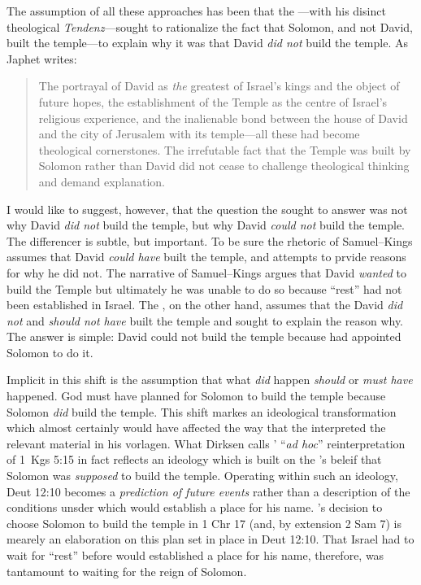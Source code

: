 The assumption of all these approaches has been that the \chronicler---with his disinct theological \emph{Tendenz}---sought to rationalize the fact that Solomon, and not David, built the temple---to explain why it was that David \emph{did not} build the temple. As Japhet writes:
\begin{quote}
    The portrayal of David as \emph{the} greatest of Israel's kings and the object of future hopes, the establishment of the Temple as the centre of Israel's religious experience, and the inalienable bond between the house of David and the city of Jerusalem with its temple---all these had become theological cornerstones. The irrefutable fact that the Temple was built by Solomon rather than David did not cease to challenge theological thinking and demand explanation.\autocite[396]{japhet1993}
\end{quote}
\noindent
I would like to suggest, however, that the question the \chronicler sought to answer was not why David \emph{did not} build the temple, but why David \emph{could not} build the temple. The differencer is subtle, but important. To be sure the rhetoric of Samuel--Kings assumes that David \emph{could have} built the temple, and attempts to prvide reasons for why he did not. The narrative of Samuel--Kings argues that David \emph{wanted} to build the Temple but ultimately he was unable to do so because ``rest'' had not been established in Israel. The \chronicler, on the other hand, assumes that the David \emph{did not} and \emph{should not have} built the temple and sought to explain the reason why. The answer is simple: David could not build the temple because \yahweh had appointed Solomon to do it. 

Implicit in this shift is the assumption that what \emph{did} happen
\emph{should} or \emph{must have} happened. God must have planned for Solomon to build the temple because Solomon \emph{did} build the temple. This shift markes an ideological transformation which almost certainly would have affected the way that the \chronicler interpreted the relevant material in his vorlagen. What Dirksen calls \chronicles' ``\emph{ad hoc}'' reinterpretation of 1~Kgs 5:15 in fact reflects an ideology which is built on the \chronicler's beleif that Solomon was \emph{supposed} to build the temple. Operating within such an ideology, Deut 12:10 becomes a \emph{prediction of future events} rather than a description of the conditions unsder which \yahweh would establish a place for his name. \yahweh's decision to choose Solomon to build the temple in 1 Chr 17 (and, by extension 2 Sam 7) is mearely an elaboration on this plan set in place in Deut 12:10. That Israel had to wait for ``rest'' before \yahweh would established a place for his name, therefore, was tantamount to waiting for the reign of Solomon. 

